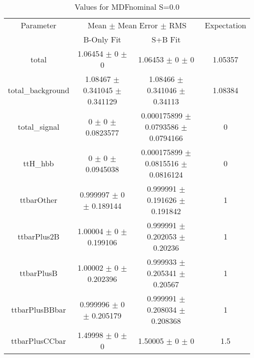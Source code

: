 \begin{table}
\centering
\caption{Values for MDFnominal S=0.0}
\begin{tabular}{cccc}
\toprule
Parameter & \multicolumn{2}{c}{Mean $\pm$ Mean Error $\pm$ RMS} & Expectation\\
 & B-Only Fit & S+B Fit & \\
\midrule
total & \num{1.06454} $\pm$ \num{0} $\pm$ \num{0} & \num{1.06453} $\pm$ \num{0} $\pm$ \num{0} & \num{1.05357}\\
total\_background & \num{1.08467} $\pm$ \num{0.341045} $\pm$ \num{0.341129} & \num{1.08466} $\pm$ \num{0.341046} $\pm$ \num{0.34113} & \num{1.08384}\\
total\_signal & \num{0} $\pm$ \num{0} $\pm$ \num{0.0823577} & \num{0.000175899} $\pm$ \num{0.0793586} $\pm$ \num{0.0794166} & \num{0}\\
ttH\_hbb & \num{0} $\pm$ \num{0} $\pm$ \num{0.0945038} & \num{0.000175899} $\pm$ \num{0.0815516} $\pm$ \num{0.0816124} & \num{0}\\
ttbarOther & \num{0.999997} $\pm$ \num{0} $\pm$ \num{0.189144} & \num{0.999991} $\pm$ \num{0.191626} $\pm$ \num{0.191842} & \num{1}\\
ttbarPlus2B & \num{1.00004} $\pm$ \num{0} $\pm$ \num{0.199106} & \num{0.999991} $\pm$ \num{0.202053} $\pm$ \num{0.20236} & \num{1}\\
ttbarPlusB & \num{1.00002} $\pm$ \num{0} $\pm$ \num{0.202396} & \num{0.999933} $\pm$ \num{0.205341} $\pm$ \num{0.20567} & \num{1}\\
ttbarPlusBBbar & \num{0.999996} $\pm$ \num{0} $\pm$ \num{0.205179} & \num{0.999991} $\pm$ \num{0.208034} $\pm$ \num{0.208368} & \num{1}\\
ttbarPlusCCbar & \num{1.49998} $\pm$ \num{0} $\pm$ \num{0} & \num{1.50005} $\pm$ \num{0} $\pm$ \num{0} & \num{1.5}\\
\bottomrule
\end{tabular}
\end{table}